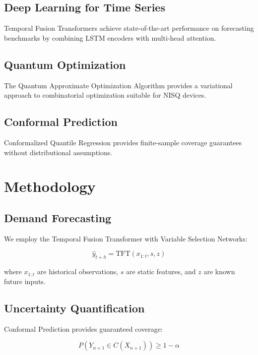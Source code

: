 \documentclass[11pt,a4paper]{article}
\begin{document}
\subsection{Deep Learning for Time Series}
Temporal Fusion Transformers \cite{lim2021tft} achieve state-of-the-art performance on forecasting benchmarks by combining LSTM encoders with multi-head attention.

\subsection{Quantum Optimization}
The Quantum Approximate Optimization Algorithm \cite{farhi2014qaoa} provides a variational approach to combinatorial optimization suitable for NISQ devices.

\subsection{Conformal Prediction}
Conformalized Quantile Regression \cite{romano2019cqr} provides finite-sample coverage guarantees without distributional assumptions.

\section{Methodology}

\subsection{Demand Forecasting}

We employ the Temporal Fusion Transformer with Variable Selection Networks:

\begin{equation}
    \hat{y}_{t+h} = \text{TFT}(x_{1:t}, s, z)
\end{equation}

where $x_{1:t}$ are historical observations, $s$ are static features, and $z$ are known future inputs.

\subsection{Uncertainty Quantification}

Conformal Prediction provides guaranteed coverage:

\begin{equation}
    P(Y_{n+1} \in C(X_{n+1})) \geq 1 - \alpha
\end{equation}
\end{document}
